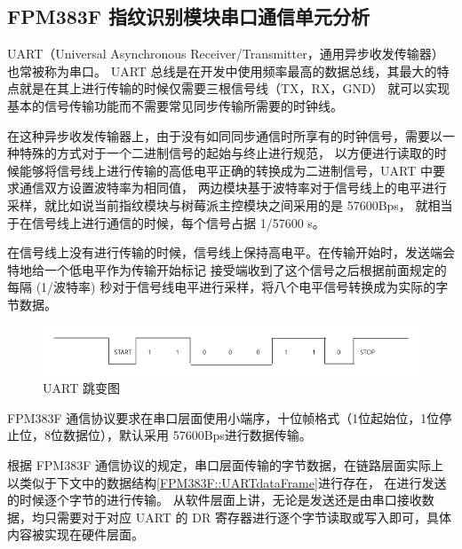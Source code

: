 

    \subsection{FPM383F 指纹识别模块串口通信单元分析}

    UART（Universal Asynchronous Receiver/Transmitter，通用异步收发传输器）也常被称为串口。
    UART 总线是在开发中使用频率最高的数据总线，其最大的特点就是在其上进行传输的时候仅需要三根信号线（TX，RX，GND）
    就可以实现基本的信号传输功能而不需要常见同步传输所需要的时钟线。

    在这种异步收发传输器上，由于没有如同同步通信时所享有的时钟信号，需要以一种特殊的方式对于一个二进制信号的起始与终止进行规范，
    以方便进行读取的时候能够将信号线上进行传输的高低电平正确的转换成为二进制信号，UART 中要求通信双方设置波特率为相同值，
    两边模块基于波特率对于信号线上的电平进行采样，就比如说当前指纹模块与树莓派主控模块之间采用的是 57600Bps，
    就相当于在信号线上进行通信的时候，每个信号占据 1/57600 s。

    在信号线上没有进行传输的时候，信号线上保持高电平。在传输开始时，发送端会特地给一个低电平作为传输开始标记
    接受端收到了这个信号之后根据前面规定的每隔 (1/波特率) 秒对于信号线电平进行采样，将八个电平信号转换成为实际的字节数据。

    \begin{figure}[ht]
        \centering
        \caption{UART 跳变图}    \label{fig::uart}
        \includegraphics[scale=0.4]{imgs/UART跳变图.png}
    \end{figure}

    FPM383F 通信协议要求在串口层面使用小端序，十位帧格式（1位起始位，1位停止位，8位数据位），默认采用 57600Bps进行数据传输。
    \cite{noauthor_fpm383c_nodate}

    根据 FPM383F 通信协议的规定，串口层面传输的字节数据，在链路层面实际上以类似于下文中的数据结构\ref{FPM383F::UARTdataFrame}进行存在，
    在进行发送的时候逐个字节的进行传输。\cite{fpm383c-modular-communication-protocol}
    从软件层面上讲，无论是发送还是由串口接收数据，均只需要对于对应 UART 的 DR 寄存器进行逐个字节读取或写入即可，具体内容被实现在硬件层面。
    
